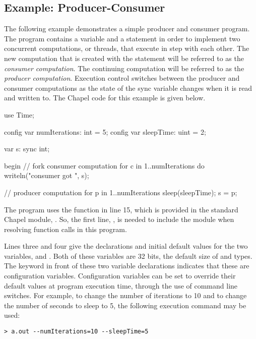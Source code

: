 \subsection{Example: Producer-Consumer}
The following example demonstrates a simple producer and consumer program.
The program contains a  variable and a  statement 
in order to implement two concurrent computations, or threads, that execute 
in step with each other.
The new computation that is created with the  statement will 
be referred to as the {\em consumer computation}.  The continuing computation
will be referred to as the
{\em producer computation}.  Execution control switches between the
producer and consumer computations as the state of the sync variable  
changes when it is read and written to.  The Chapel code for this example is given below.

\begin{numberedchapel}
use Time;

config var numIterations: int = 5;
config var sleepTime: uint = 2;

var s: sync int;

begin {  // fork consumer computation
  for c in 1..numIterations do
    writeln("consumer got ", s);
}

// producer computation
for p in 1..numIterations {
  sleep(sleepTime);
  s = p;
}
\end{numberedchapel}

The program uses the  function in line 15, which is provided in the
standard Chapel module, .  So, the first line, , 
is needed to include the  module when resolving 
function calls in this program.  

Lines three and four give the declarations and initial default values
for the two variables,  and .
Both of these variables are 32 bits, the default size of  and  types.
The  keyword in front of these two variable declarations 
indicates that these are configuration variables.  Configuration variables 
can be set to override their default values at program execution time, through the 
use of command line switches.  For example, to change the number of iterations to 10
and to change the number of seconds to sleep to 5, the following execution command 
may be used:
\begin{verbatim}
> a.out --numIterations=10 --sleepTime=5
\end{verbatim}

